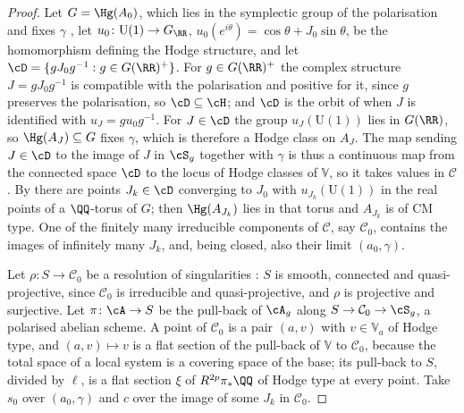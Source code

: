 \begin{proof}
Let $G=\Hg(A_{0})$, which lies in the symplectic group of the polarisation
and fixes $\gamma$ \cite[\S3]{Del82}, let
$u_{0}\colon\mathrm{U}(1)\to G_{\RR}$,
$u_{0}(e^{i\theta})=\cos\theta+J_{0}\sin\theta$, be the homomorphism defining
the Hodge structure, and let
$\cD=\{gJ_{0}g^{-1}:g\in G(\RR)^{+}\}$. For $g\in G(\RR)^{+}$ the complex
structure $J=gJ_{0}g^{-1}$ is compatible with the polarisation and positive
for it, since $g$ preserves the polarisation, so $\cD\subseteq\cH$; and
$\cD$ is the orbit of  when $J$ is identified with
$u_{J}=gu_{0}g^{-1}$. For $J\in\cD$ the group $u_{J}(\mathrm{U}(1))$ lies in
$G(\RR)$, so $\Hg(A_{J})\subseteq G$ fixes $\gamma$, which is therefore a
Hodge class on $A_{J}$. The map sending $J\in\cD$ to the image of $J$ in
$\cS_{g}$ together with $\gamma$ is thus a continuous map from the
connected space $\cD$ to the locus of Hodge classes of $\mathbb{V}$, so it
takes values in $\mathcal{C}$. By  there are points
$J_{k}\in\cD$ converging to $J_{0}$ with $u_{J_{k}}(\mathrm{U}(1))$ in the
real points of a $\QQ$-torus of $G$; then $\Hg(A_{J_{k}})$ lies in that torus
and $A_{J_{k}}$ is of CM type. One of the finitely many irreducible
components of $\mathcal{C}$, say $\mathcal{C}_{0}$, contains the images of
infinitely many $J_{k}$, and, being closed, also their limit $(a_{0},\gamma)$.

Let $\rho\colon S\to\mathcal{C}_{0}$ be a resolution of singularities
\cite{Hir64}: $S$ is smooth, connected and quasi-projective, since
$\mathcal{C}_{0}$ is irreducible and quasi-projective, and $\rho$ is
projective and surjective. Let $\pi\colon\cA\to S$ be the pull-back of
$\cA_{g}$ along $S\to\mathcal{C}_{0}\to\cS_{g}$, a polarised abelian scheme.
A point of $\mathcal{C}_{0}$ is a pair $(a,v)$ with $v\in\mathbb{V}_{a}$ of
Hodge type, and $(a,v)\mapsto v$ is a flat section of the pull-back of
$\mathbb{V}$ to $\mathcal{C}_{0}$, because the total space of a local system
is a covering space of the base; its pull-back to $S$, divided by $\ell$, is
a flat section $\xi$ of $R^{2p}\pi_{*}\QQ$ of Hodge type at every point.
Take $s_{0}$ over $(a_{0},\gamma)$ and $c$ over the image of some $J_{k}$ in
$\mathcal{C}_{0}$.
\end{proof}

